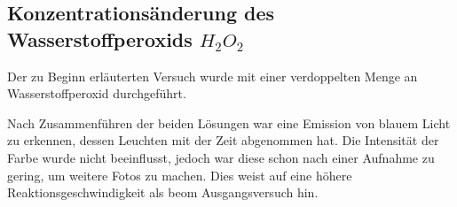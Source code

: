 \subsection{Konzentrationsänderung des Wasserstoffperoxids $H_{2}O_{2}$}
Der zu Beginn erläuterten Versuch wurde mit einer verdoppelten Menge an Wasserstoffperoxid durchgeführt.

Nach Zusammenführen der beiden Lösungen war eine Emission von blauem Licht zu erkennen, dessen Leuchten mit der Zeit abgenommen hat. Die Intensität der Farbe wurde nicht beeinflusst, jedoch war diese schon nach einer Aufnahme zu gering, um weitere Fotos zu machen. Dies weist auf eine höhere Reaktionsgeschwindigkeit als beom Ausgangsversuch hin. 
